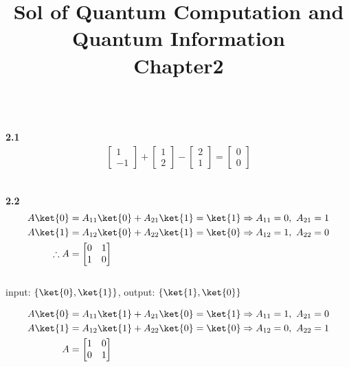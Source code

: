 \documentclass[10pt]{book}
\title{\LARGE \bf
	Sol of Quantum Computation and Quantum Information\\ Chapter2
}
\newcommand{\Textbf}[1]{\hspace{3mm}\\ \textbf{#1}\\}
\begin{document}
	\maketitle
	\thispagestyle{empty}
	\pagestyle{empty}
	
	\Textbf{2.1}
	
	\begin{equation}
\begin{aligned}
		\begin{bmatrix}
			1 \\
			-1
		\end{bmatrix}
		+
		\begin{bmatrix}
			1 \\
			2
		\end{bmatrix}
		-
		\begin{bmatrix}
			2 \\
			1
		\end{bmatrix}
		=
		\begin{bmatrix}
			0 \\
			0
		\end{bmatrix}
	\end{aligned}
\end{equation}
	
	\Textbf{2.2}
	
	\begin{equation}
\begin{aligned}
		A\ket{0} &= A_{11}\ket{0} + A_{21}\ket{1} = \ket{1} \Rightarrow A_{11} = 0,\ A_{21} = 1\\
		A\ket{1} &= A_{12}\ket{0} + A_{22}\ket{1} = \ket{0} \Rightarrow A_{12} = 1,\ A_{22} = 0\\
		\therefore A &=
		\begin{bmatrix}
			0 & 1 \\
			1 & 0
		\end{bmatrix}
	\end{aligned}
\end{equation}\\
	
	input: $\left\{\ket{0}, \ket{1}\right\}$,
	output: $\left\{\ket{1}, \ket{0}\right\}$
	
	\begin{equation}
\begin{aligned}
		A\ket{0}&= A_{11}\ket{1} + A_{21}\ket{0} = \ket{1} \Rightarrow A_{11} = 1,\ A_{21} = 0\\
		A\ket{1} &= A_{12}\ket{1} + A_{22}\ket{0} = \ket{0} \Rightarrow A_{12} = 0,\ A_{22} = 1\\
		A &=
		\begin{bmatrix}
			1 & 0 \\
			0 & 1
		\end{bmatrix}
	\end{aligned}
\end{equation}
	
\end{document}
